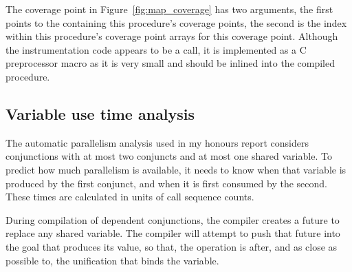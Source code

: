 The coverage point in Figure~\ref{fig:map_coverage}
has two arguments,
the first points to the \PS containing this procedure's coverage points,
the second is the index within this procedure's coverage point arrays
for this coverage point.
Although the instrumentation code appears to be a call,
it is implemented as a C preprocessor macro as it is very small and should
be inlined into the compiled procedure.


\subsection{Variable use time analysis}
\label{sec:backgnd_var_use_analysis}

The automatic parallelism analysis used in my honours report considers
conjunctions with at most two conjuncts and at most one shared variable.
To predict how much parallelism is available,
it needs to know when that variable is produced by the first conjunct,
and when it is first consumed by the second.
These times are calculated in units of call sequence counts.

During compilation of dependent conjunctions,
the compiler creates a future to replace any shared variable.
The compiler will attempt to push that future into the goal that
produces its value,
so that,
the \signal operation is after, and as close as possible
to, the unification that binds the variable.

